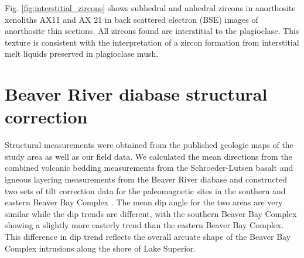 Fig. \ref{fig:interstitial_zircons} shows subhedral and anhedral zircons in anorthosite xenoliths AX11 and AX 21 in back scattered electron (BSE) images of anorthosite thin sections. All zircons found are interstitial to the plagioclase. This texture is consistent with the interpretation of a zircon formation from interstitial melt liquids preserved in plagioclase mush.

\section*{Beaver River diabase structural correction}

Structural measurements were obtained from the published geologic maps of the study area as well as our field data. We calculated the mean directions from the combined volcanic bedding measurements from the Schroeder-Lutsen basalt and igneous layering measurements from the Beaver River diabase and constructed two sets of tilt correction data for the paleomagnetic sites in the southern and eastern Beaver Bay Complex \citep{Boerboom2004a, Boerboom2006a, Boerboom2006b, Boerboom2007a, Miller2001a}. The mean dip angle for the two areas are very similar while the dip trends are different, with the southern Beaver Bay Complex showing a slightly more easterly trend than the eastern Beaver Bay Complex. This difference in dip trend reflects the overall arcuate shape of the Beaver Bay Complex intrusions along the shore of Lake Superior. 

